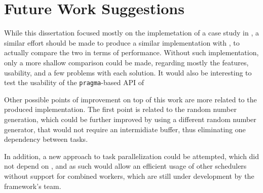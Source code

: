 \documentclass[main.tex]{subfiles}
\begin{document}
\chapter{Future Work Suggestions}

While this dissertation focused mostly on the implemetation of a case study in \starpu, a similar effort should be made to produce a similar implementation with \gama, to actually compare the two in terms of performance. Without such implementation, only a more shallow comparison could be made, regarding mostly the features, usability, and a few problems with each solution.
It would also be interesting to test the usability of the \texttt{pragma}-based API of \starpu

Other possible points of improvement on top of this work are more related to the produced implementation. The first point is related to the random number generation, which could be further improved by using a different random number generator, that would not require an intermidiate buffer, thus eliminating one dependency between tasks.

In addition, a new approach to task parallelization could be attempted, which did not depend on \openmp, and as such would allow an efficient usage of other \starpu schedulers without support for combined workers, which are still under development by the framework's team.
\end{document}
